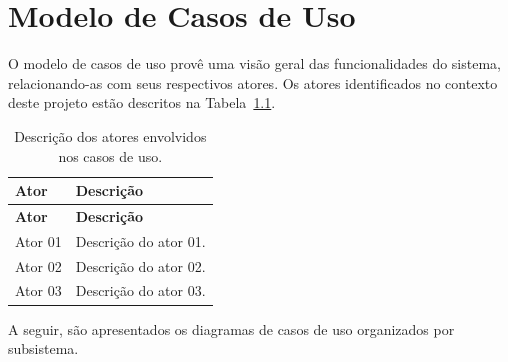\chapter{Modelo de Casos de Uso}
\label{sec-casos-de-uso}
\vspace{-1cm}

\renewcommand*\theuccount{UC-\arabic{uccount}}
\newcommand*\UC{\refstepcounter{uccount}\theuccount}
\setcounter{uccount}{0}


O modelo de casos de uso provê uma visão geral das funcionalidades do sistema, relacionando-as com seus respectivos atores. Os atores identificados no contexto deste projeto estão descritos na Tabela~\ref{tbl-casos-de-uso-atores}.

\begin{longtable}{|p{3cm}|p{12cm}|}
	\caption{Descrição dos atores envolvidos nos casos de uso.}
	\label{tbl-casos-de-uso-atores} \\\hline 
	
	\rowcolor{lightgray}
	\textbf{Ator} & \textbf{Descrição} \\\hline		
	\endfirsthead
	\hline
	\rowcolor{lightgray}
	\textbf{Ator} & \textbf{Descrição} \\\hline		
	\endhead
	
	Ator 01 & Descrição do ator 01. \\\hline
	
	Ator 02 & Descrição do ator 02. \\\hline
	
	Ator 03 & Descrição do ator 03. \\\hline
\end{longtable}

A seguir, são apresentados os diagramas de casos de uso organizados por subsistema.



